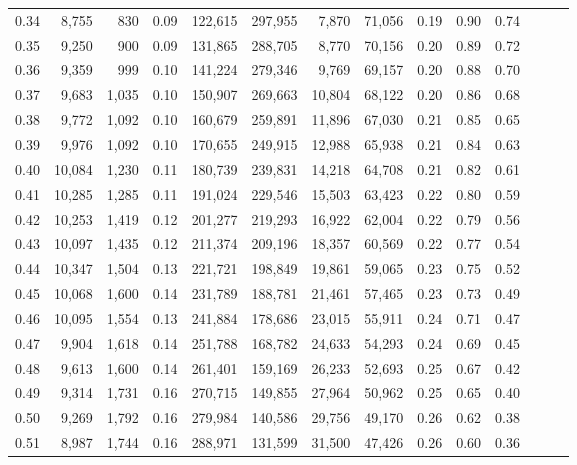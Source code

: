 \begin{tabular}{rrrrrrrrrrrrrr}
0.34 &   8,755 &    830 &  0.09 &  122,615 &  297,955 &   7,870 &  71,056 &  0.19 &  0.90 &      0.74 \\
0.35 &   9,250 &    900 &  0.09 &  131,865 &  288,705 &   8,770 &  70,156 &  0.20 &  0.89 &      0.72 \\
0.36 &   9,359 &    999 &  0.10 &  141,224 &  279,346 &   9,769 &  69,157 &  0.20 &  0.88 &      0.70 \\
0.37 &   9,683 &  1,035 &  0.10 &  150,907 &  269,663 &  10,804 &  68,122 &  0.20 &  0.86 &      0.68 \\
0.38 &   9,772 &  1,092 &  0.10 &  160,679 &  259,891 &  11,896 &  67,030 &  0.21 &  0.85 &      0.65 \\
0.39 &   9,976 &  1,092 &  0.10 &  170,655 &  249,915 &  12,988 &  65,938 &  0.21 &  0.84 &      0.63 \\
0.40 &  10,084 &  1,230 &  0.11 &  180,739 &  239,831 &  14,218 &  64,708 &  0.21 &  0.82 &      0.61 \\
0.41 &  10,285 &  1,285 &  0.11 &  191,024 &  229,546 &  15,503 &  63,423 &  0.22 &  0.80 &      0.59 \\
0.42 &  10,253 &  1,419 &  0.12 &  201,277 &  219,293 &  16,922 &  62,004 &  0.22 &  0.79 &      0.56 \\
0.43 &  10,097 &  1,435 &  0.12 &  211,374 &  209,196 &  18,357 &  60,569 &  0.22 &  0.77 &      0.54 \\
0.44 &  10,347 &  1,504 &  0.13 &  221,721 &  198,849 &  19,861 &  59,065 &  0.23 &  0.75 &      0.52 \\
0.45 &  10,068 &  1,600 &  0.14 &  231,789 &  188,781 &  21,461 &  57,465 &  0.23 &  0.73 &      0.49 \\
0.46 &  10,095 &  1,554 &  0.13 &  241,884 &  178,686 &  23,015 &  55,911 &  0.24 &  0.71 &      0.47 \\
0.47 &   9,904 &  1,618 &  0.14 &  251,788 &  168,782 &  24,633 &  54,293 &  0.24 &  0.69 &      0.45 \\
0.48 &   9,613 &  1,600 &  0.14 &  261,401 &  159,169 &  26,233 &  52,693 &  0.25 &  0.67 &      0.42 \\
0.49 &   9,314 &  1,731 &  0.16 &  270,715 &  149,855 &  27,964 &  50,962 &  0.25 &  0.65 &      0.40 \\
0.50 &   9,269 &  1,792 &  0.16 &  279,984 &  140,586 &  29,756 &  49,170 &  0.26 &  0.62 &      0.38 \\
0.51 &   8,987 &  1,744 &  0.16 &  288,971 &  131,599 &  31,500 &  47,426 &  0.26 &  0.60 &      0.36 \\

\end{tabular}
